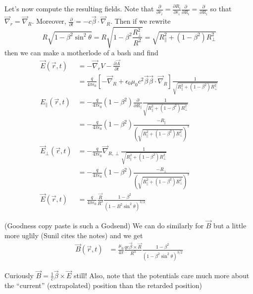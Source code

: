 \documentclass[10pt]{report}
\newcommand{\pd}[2]{\frac{\partial #1}{\partial#2}}
\begin{document}
Let's now compute the resulting fields. Note that $\pd{}{r_i} = \pd{R_i}{r_i}\pd{}{R_i} = \pd{}{R_i}$ so that $\vec{\nabla}_{r} = \vec{\nabla}_{R}$. Moreover, $\pd{}{t} = -c\vec{\beta} \cdot \vec{\nabla}_R$. Then if we rewrite
\begin{equation}
    R\sqrt{1 - \beta^2 \sin^2\theta} = R\sqrt{1 - \beta^2 \frac{R_{\perp}^2}{R^2}} = \sqrt{R_{\parallel}^2 + \left( 1 - \beta^2 \right)R_{\perp}^2}
\end{equation}
then we can make a motherlode of a bash and find
\begin{align}
    \vec{E}(\vec{r},t) &= -\vec{\nabla}_rV - \pd{\vec{A}}{t}\\
    &= \frac{q}{4\pi\epsilon_0}\left[ -\vec{\nabla}_R + \epsilon_0 \mu_0 c^2 \vec{\beta}\vec{\beta}\cdot \vec{\nabla}_R \right]\frac{1}{\sqrt{R_{\parallel}^2 + \left( 1 - \beta^2 \right)R_{\perp}^2}}\\
    E_{\parallel}(\vec{r},t) &= -\frac{q}{4\pi\epsilon_0}\left( 1 - \beta^2 \right)\pd{}{R_{\parallel}}\frac{1}{\sqrt{R_{\parallel}^2 + \left( 1 - \beta^2 \right)R_{\perp}^2}}\\
    &= -\frac{q}{4\pi\epsilon_0}\left( 1 - \beta^2 \right)\frac{-R_{\parallel}}{\left(\sqrt{R_{\parallel}^2 + \left( 1 - \beta^2 \right)R_{\perp}^2}\right)^3}\\
    \vec{E}_{\perp}(\vec{r},t) &= -\frac{q}{4\pi\epsilon_0}\vec{\nabla}_{R,\perp}\frac{1}{\sqrt{R_{\parallel}^2 + \left( 1 - \beta^2 \right)R_{\perp}^2}}\\
    &= -\frac{q}{4\pi\epsilon_0}\left( 1 - \beta^2 \right)\frac{-R_{\perp}}{\left( \sqrt{R_{\parallel}^2 + \left( 1 - \beta^2 \right)R_{\perp}^2} \right)^3}\\
    \vec{E}(\vec{r},t) &= \frac{q}{4\pi\epsilon_0}\frac{\vec{R}}{R^3}\frac{1-\beta^2}{\left(1 - B^2 \sin^2\theta\right)^{3/2}}
\end{align}

(Goodness copy paste is such a Godsend) We can do similarly for $\vec{B}$ but a little more uglily (Sunil cites the notes) and we get
\begin{align}
    \vec{B}(\vec{r},t) &= \frac{\mu_0}{4\pi}\frac{qc\vec{\beta} \times \vec{R}}{R^3}\frac{1 - \beta^2}{\left( 1 - \beta^2\sin^2\theta \right)^{3/2}}
\end{align}

Curiously $\vec{B} = \frac{1}{c}\vec{\beta} \times \vec{E}$ still! Also, note that the potentials care much more about the ``current'' (extrapolated) position than the retarded position)
\end{document}
